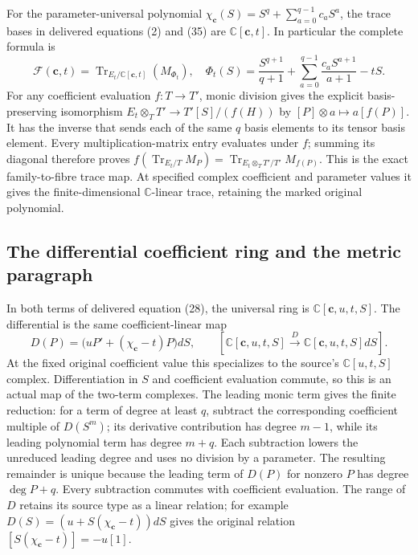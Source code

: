 \documentclass{article}
\begin{document}
For the parameter-universal polynomial
$\chi_{\mathbf c}(S)=S^q+\sum_{a=0}^{q-1}c_aS^a$, the trace bases
in delivered equations (2) and (35) are
$\mathbb C[\mathbf c,t]$.  In particular the complete formula is
\[
 \mathcal F(\mathbf c,t)
 =\operatorname{Tr}_{E_t/\mathbb C[\mathbf c,t]}(M_{\Phi_t}),
 \quad
 \Phi_t(S)=\frac{S^{q+1}}{q+1}
       +\sum_{a=0}^{q-1}\frac{c_aS^{a+1}}{a+1}-tS.
 \tag{SGAC5}
\]
For any coefficient evaluation $f:T\to T'$, monic division gives
the explicit basis-preserving isomorphism
$E_t\otimes_TT'\to T'[S]/(f(H))$ by
$[P]\otimes a\mapsto a[f(P)]$.  It has the inverse that sends
each of the same $q$ basis elements to its tensor basis element.
Every multiplication-matrix entry evaluates under $f$; summing its
diagonal therefore proves
$f(\operatorname{Tr}_{E_t/T}M_P)
=\operatorname{Tr}_{E_t\otimes_TT'/T'}M_{f(P)}$.
This is the exact family-to-fibre trace map.  At specified complex
coefficient and parameter values it gives the finite-dimensional
$\mathbb C$-linear trace, retaining the marked original polynomial.

\subsection{The differential coefficient ring and the metric paragraph}

In both terms of delivered equation (28), the universal ring is
$\mathbb C[\mathbf c,u,t,S]$.  The differential is the same
coefficient-linear map
\[
 D(P)=\bigl(uP'+(\chi_{\mathbf c}-t)P\bigr)dS,
 \qquad
 [\mathbb C[\mathbf c,u,t,S]\xrightarrow{D}
      \mathbb C[\mathbf c,u,t,S]dS].
 \tag{SGAC6}
\]
At the fixed original coefficient value this specializes to the
source's $\mathbb C[u,t,S]$ complex.  Differentiation in $S$ and
coefficient evaluation commute, so this is an actual map of the
two-term complexes.  The leading monic term gives the finite
reduction: for a term of degree at least $q$, subtract the corresponding
coefficient multiple of $D(S^m)$; its derivative contribution has
degree $m-1$, while its leading polynomial term has degree $m+q$.
Each subtraction lowers the unreduced leading degree and uses no
division by a parameter.  The resulting remainder is unique because
the leading term of $D(P)$ for nonzero $P$ has degree $\deg P+q$.
Every subtraction commutes with coefficient evaluation.  The range
of $D$ retains its source type as a linear relation; for example
$D(S)=(u+S(\chi_{\mathbf c}-t))dS$ gives the original relation
$[S(\chi_{\mathbf c}-t)]=-u[1]$.
\end{document}
